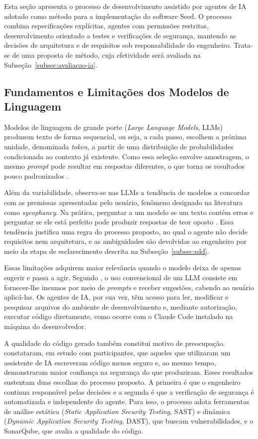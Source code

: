 
Esta seção apresenta o processo de desenvolvimento assistido por agentes de IA adotado como método para a implementação do software Seed. O processo combina especificações explícitas, agentes com permissões restritas, desenvolvimento orientado a testes e verificações de segurança, mantendo as decisões de arquitetura e de requisitos sob responsabilidade do engenheiro. Trata-se de uma proposta de método, cuja efetividade será avaliada na Subseção~\ref{subsec:avaliacao-ia}.

\subsection{Fundamentos e Limitações dos Modelos de Linguagem}
\label{subsec:llm-limites}

Modelos de linguagem de grande porte (\textit{Large Language Models}, LLMs) produzem texto de forma sequencial, ou seja, a cada passo, escolhem a próxima unidade, denominada \textit{token}, a partir de uma distribuição de probabilidades condicionada ao contexto já existente. Como essa seleção envolve amostragem, o mesmo \textit{prompt} pode resultar em respostas diferentes, o que torna os resultados pouco padronizados \cite{akita2026vibecoding}.

Além da variabilidade, observa-se nas LLMs a tendência de modelos a concordar com as premissas apresentadas pelo usuário, fenômeno designado na literatura como \textit{sycophancy}. Na prática, perguntar a um modelo se um texto contém erros e perguntar se ele está perfeito pode produzir respostas de teor oposto \cite{akita2026vibecoding}. Essa tendência justifica uma regra do processo proposto, no qual o agente não decide requisitos nem arquitetura, e as ambiguidades são devolvidas ao engenheiro por meio da etapa de esclarecimento descrita na Subseção~\ref{subsec:sdd}.

Essas limitações adquirem maior relevância quando o modelo deixa de apenas sugerir e passa a agir. Segundo , o uso convencional de um LLM consiste em fornecer-lhe insumos por meio de \textit{prompts} e receber sugestões, cabendo ao usuário aplicá-las. Os agentes de IA, por sua vez, têm acesso para ler, modificar e pesquisar arquivos do ambiente de desenvolvimento e, mediante autorização, executar código diretamente, como ocorre com o Claude Code instalado na máquina do desenvolvedor.

A qualidade do código gerado também constitui motivo de preocupação.  constataram, em estudo com participantes, que aqueles que utilizaram um assistente de IA escreveram código menos seguro e, ao mesmo tempo, demonstraram maior confiança na segurança do que produziram. Esses resultados sustentam duas escolhas do processo proposto. A primeira é que o engenheiro continua responsável pelas decisões e a segunda é que a verificação de segurança é automatizada e independente do agente. Para isso, o processo adota ferramentas de análise estática (\textit{Static Application Security Testing}, SAST) e dinâmica (\textit{Dynamic Application Security Testing}, DAST), que buscam vulnerabilidades, e o SonarQube, que avalia a qualidade do código.


